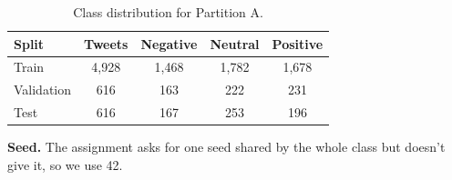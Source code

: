 \begin{table}[H]
    \centering
    \begin{tabular}{@{}lcccc@{}}
        \toprule
        \textbf{Split} & \textbf{Tweets} & \textbf{Negative} & \textbf{Neutral} & \textbf{Positive} \\
        \midrule
        Train & 4,928 & 1,468 & 1,782 & 1,678 \\
        Validation & 616 & 163 & 222 & 231 \\
        Test & 616 & 167 & 253 & 196 \\
        \bottomrule
    \end{tabular}
    \caption{Class distribution for Partition A.}
    \label{tab:partition_a}
\end{table}

\textbf{Seed.} The assignment asks for one seed shared by the whole class but doesn't give it, so we use 42.
